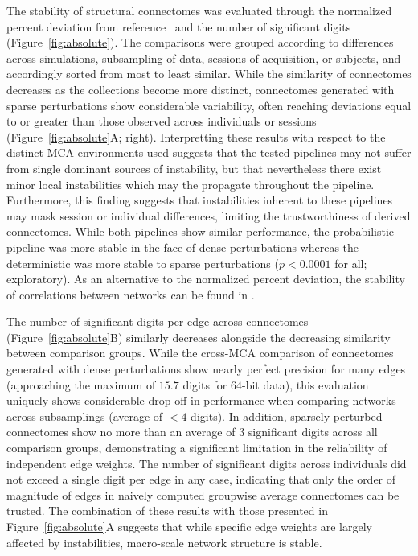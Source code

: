 \documentclass[fleqn,10pt]{SelfArx} %
\newcommand{\new}[1]{{#1}}
\newcommand{\newtwo}[1]{{#1}}
\begin{document}
The stability of \newtwo{structural} connectomes was evaluated through the \new{normalized percent} deviation from reference~\cite{Kiar2020-lb} and the number
of significant digits
(Figure~\ref{fig:absolute}). The comparisons were grouped according to differences across simulations, subsampling
of data, sessions of acquisition, or subjects, \new{and accordingly sorted from most to least similar}. While the
similarity of connectomes decreases as the collections become
more distinct, connectomes generated with \new{sparse} perturbations show considerable variability, often reaching deviations
equal to or greater than those observed across individuals or sessions (Figure~\ref{fig:absolute}A; right).
\new{Interpretting these results with respect to the distinct MCA environments used suggests that the tested pipelines
may not suffer from single dominant sources of instability, but that nevertheless there exist minor local instabilities
which may the propagate throughout the pipeline. Furthermore,} this
finding suggests that instabilities inherent to these pipelines may mask session or individual differences, limiting
the trustworthiness of derived connectomes. While both pipelines show similar performance, the probabilistic pipeline
was more stable in the face of \new{dense} perturbations whereas the deterministic was more stable to \new{sparse} perturbations
($p < 0.0001$ for all; exploratory). \new{As an alternative to the normalized percent deviation, the stability of}
correlations \new{between} networks can be found in .

The number of significant digits per edge across connectomes (Figure~\ref{fig:absolute}B) similarly decreases
\new{alongside the decreasing similarity between comparison groups}. While the cross-MCA comparison of connectomes
generated with \new{dense} perturbations show nearly perfect
precision for many edges (approaching the maximum of $15.7$ digits for $64$-bit data), this evaluation uniquely shows
considerable drop off in performance \new{when comparing networks across} subsamplings (average of $< 4$ digits). In addition, \new{sparsely
perturbed connectomes} show no more than an average of $3$ significant digits across all \new{comparison} groups, demonstrating a significant
limitation in the reliability \new{of} independent edge weights. \new{The number of significant digits} across individuals did not exceed a single digit
per edge in any case, indicating that only the order \new{of} magnitude of edges in naively computed groupwise average connectomes can
be trusted. The combination of these results with those presented in Figure~\ref{fig:absolute}A suggests that while
specific edge weights are largely affected by instabilities, macro-scale network \new{structure} is stable.
\end{document}
